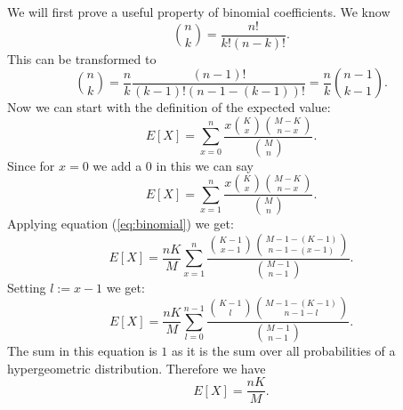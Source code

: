\documentclass[12pt]{article}
\begin{document}
We will first prove a useful property of binomial coefficients. We know
$${n\choose k}=\frac{n!}{k!(n-k)!}.$$
This can be transformed to
\begin{equation}\label{eq:binomial}
{n\choose k}=\frac{n}{k}\frac{(n-1)!}{(k-1)!(n-1-(k-1))!}=\frac{n}{k}{n-1\choose k-1}.
\end{equation}
Now we can start with the definition of the expected value:
$$E[X]=\sum_{x=0}^n \frac{x{K\choose x}{M-K\choose n-x}}{{M\choose n}}.$$
Since for $x=0$ we add a $0$ in this  we can say
$$E[X]=\sum_{x=1}^n \frac{x{K\choose x}{M-K\choose n-x}}{{M\choose n}}.$$
Applying equation (\ref{eq:binomial}) we get:
$$E[X]=\frac{nK}{M}\sum_{x=1}^n \frac{{K-1\choose x-1}{M-1-(K-1)\choose n-1-(x-1)}}{{M-1\choose n-1}}.$$
Setting $l:=x-1$ we get:
$$E[X]=\frac{nK}{M}\sum_{l=0}^{n-1}\frac{{K-1\choose l}{M-1-(K-1)\choose n-1-l}}{{M-1\choose n-1}}.$$
The sum in this equation is $1$ as it is the sum over all probabilities of a hypergeometric distribution. Therefore we have
$$E[X]=\frac{nK}{M}.$$
\end{document}
